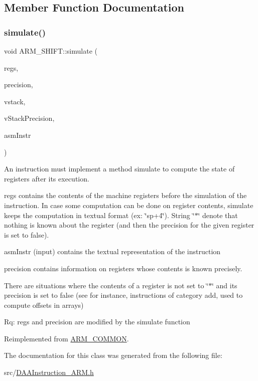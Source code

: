 \subsection{Member Function Documentation}
\mbox{\label{classARM__SHIFT_a0438bca8496243c4067bb1ec24abeab4}} 
\subsubsection{\texorpdfstring{simulate()}{simulate()}}
{\footnotesize\ttfamily void A\+R\+M\+\_\+\+S\+H\+I\+F\+T\+::simulate (\begin{DoxyParamCaption}\item[{\hyperlink{DAAInstruction_8h_af0fae93a861de9cf37988d5673cac523}{reg\+Table} \&}]{regs,  }\item[{\hyperlink{DAAInstruction_8h_a0e8cae02815a5f8adc750122d790b455}{reg\+Precision\+Table} \&}]{precision,  }\item[{\hyperlink{DAAInstruction_8h_a1b0e70ac1a04f06c8132055ed01f589f}{stack\+Type} \&}]{vstack,  }\item[{\hyperlink{DAAInstruction_8h_ac5cb793e9dac3fa9693da78b7e29ab30}{stack\+Prec\+Type} \&}]{v\+Stack\+Precision,  }\item[{const string \&}]{asm\+Instr }\end{DoxyParamCaption})\hspace{0.3cm}{\ttfamily [virtual]}}

An instruction must implement a method simulate to compute the state of registers after its execution.

regs contains the contents of the machine registers before the simulation of the instruction. In case some computation can be done on register contents, simulate keeps the computation in textual format (ex\+: \char`\"{}sp+4\char`\"{}). String \char`\"{}$\ast$\char`\"{} denote that nothing is known about the register (and then the precision for the given register is set to false).

asm\+Instr (input) contains the textual representation of the instruction

precision contains information on registers whose contents is known precisely.

There are situations where the contents of a register is not set to \char`\"{}$\ast$\char`\"{} and its precision is set to false (see for instance, instructions of category add, used to compute offsets in arrays)

Rq\+: regs and precision are modified by the simulate function 

Reimplemented from \hyperlink{classARM__COMMON_a89eb552311ce787557a976aee2fa2db6}{A\+R\+M\+\_\+\+C\+O\+M\+M\+ON}.



The documentation for this class was generated from the following file\+:\begin{DoxyCompactItemize}
\item 
src/\hyperlink{DAAInstruction__ARM_8h}{D\+A\+A\+Instruction\+\_\+\+A\+R\+M.\+h}\end{DoxyCompactItemize}

